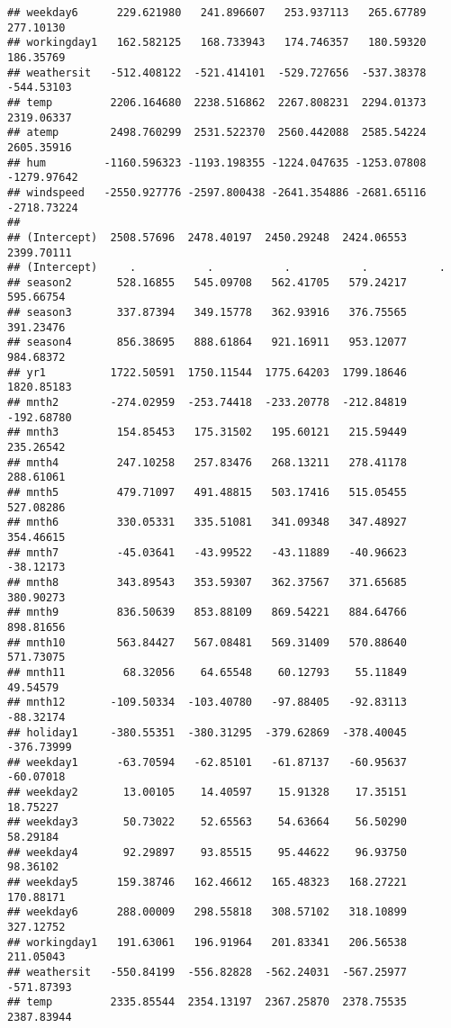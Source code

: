 \documentclass[]{article}
\begin{document}
\begin{verbatim}
## weekday6      229.621980   241.896607   253.937113   265.67789   277.10130
## workingday1   162.582125   168.733943   174.746357   180.59320   186.35769
## weathersit   -512.408122  -521.414101  -529.727656  -537.38378  -544.53103
## temp         2206.164680  2238.516862  2267.808231  2294.01373  2319.06337
## atemp        2498.760299  2531.522370  2560.442088  2585.54224  2605.35916
## hum         -1160.596323 -1193.198355 -1224.047635 -1253.07808 -1279.97642
## windspeed   -2550.927776 -2597.800438 -2641.354886 -2681.65116 -2718.73224
##                                                                        
## (Intercept)  2508.57696  2478.40197  2450.29248  2424.06553  2399.70111
## (Intercept)     .           .           .           .           .      
## season2       528.16855   545.09708   562.41705   579.24217   595.66754
## season3       337.87394   349.15778   362.93916   376.75565   391.23476
## season4       856.38695   888.61864   921.16911   953.12077   984.68372
## yr1          1722.50591  1750.11544  1775.64203  1799.18646  1820.85183
## mnth2        -274.02959  -253.74418  -233.20778  -212.84819  -192.68780
## mnth3         154.85453   175.31502   195.60121   215.59449   235.26542
## mnth4         247.10258   257.83476   268.13211   278.41178   288.61061
## mnth5         479.71097   491.48815   503.17416   515.05455   527.08286
## mnth6         330.05331   335.51081   341.09348   347.48927   354.46615
## mnth7         -45.03641   -43.99522   -43.11889   -40.96623   -38.12173
## mnth8         343.89543   353.59307   362.37567   371.65685   380.90273
## mnth9         836.50639   853.88109   869.54221   884.64766   898.81656
## mnth10        563.84427   567.08481   569.31409   570.88640   571.73075
## mnth11         68.32056    64.65548    60.12793    55.11849    49.54579
## mnth12       -109.50334  -103.40780   -97.88405   -92.83113   -88.32174
## holiday1     -380.55351  -380.31295  -379.62869  -378.40045  -376.73999
## weekday1      -63.70594   -62.85101   -61.87137   -60.95637   -60.07018
## weekday2       13.00105    14.40597    15.91328    17.35151    18.75227
## weekday3       50.73022    52.65563    54.63664    56.50290    58.29184
## weekday4       92.29897    93.85515    95.44622    96.93750    98.36102
## weekday5      159.38746   162.46612   165.48323   168.27221   170.88171
## weekday6      288.00009   298.55818   308.57102   318.10899   327.12752
## workingday1   191.63061   196.91964   201.83341   206.56538   211.05043
## weathersit   -550.84199  -556.82828  -562.24031  -567.25977  -571.87393
## temp         2335.85544  2354.13197  2367.25870  2378.75535  2387.83944

\end{verbatim}
\end{document}
